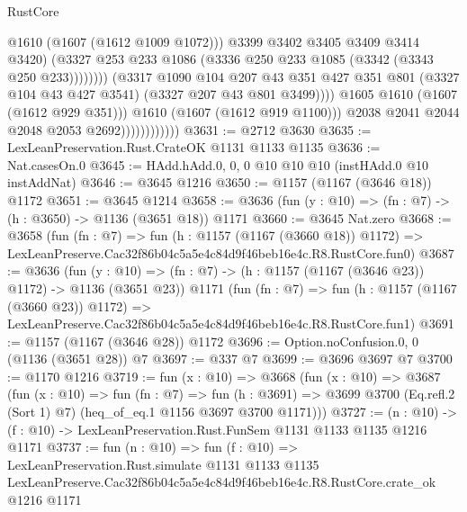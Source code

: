 \begin{lexlean}{RustCore}
\begin{coremodule}
                                                @1610
                                                (@1607 (@1612 @1009 @1072)))
                                              @3399
                                              @3402
                                              @3405
                                              @3409
                                              @3414
                                              @3420)
                                            (@3327
                                              @253
                                              @233
                                              @1086
                                              (@3336 @250 @233 @1085 (@3342 (@3343 @250 @233))))))))
                                    (@3317
                                      @1090
                                      @104
                                      @207
                                      @43
                                      @351
                                      @427
                                      @351
                                      @801
                                      (@3327 @104 @43 @427 @3541)
                                      (@3327 @207 @43 @801 @3499))))
                                @1605
                                @1610
                                (@1607 (@1612 @929 @351)))
                              @1610
                              (@1607 (@1612 @919 @1100)))
                            @2038
                            @2041
                            @2044
                            @2048
                            @2053
                            @2692))))))))))))
@3631 := @2712 @3630
@3635 := LexLeanPreservation.Rust.CrateOK @1131 @1133 @1135
@3636 := Nat.casesOn.{0}
@3645 := HAdd.hAdd.{0, 0, 0} @10 @10 @10 (instHAdd.{0} @10 instAddNat)
@3646 := @3645 @1216
@3650 := @1157 (@1167 (@3646 @18)) @1172
@3651 := @3645 @1214
@3658 := @3636 (fun (y : @10) => (fn : @7) -> (h : @3650) -> @1136 (@3651 @18)) @1171
@3660 := @3645 Nat.zero
@3668 := @3658
    (fun (fn : @7) =>
    fun (h : @1157 (@1167 (@3660 @18)) @1172) =>
    LexLeanPreserve.Cac32f86b04c5a5e4c84d9f46beb16e4c.R8.RustCore.fun0)
@3687 := @3636
    (fun (y : @10) => (fn : @7) -> (h : @1157 (@1167 (@3646 @23)) @1172) -> @1136 (@3651 @23))
    @1171
    (fun (fn : @7) =>
    fun (h : @1157 (@1167 (@3660 @23)) @1172) =>
    LexLeanPreserve.Cac32f86b04c5a5e4c84d9f46beb16e4c.R8.RustCore.fun1)
@3691 := @1157 (@1167 (@3646 @28)) @1172
@3696 := Option.noConfusion.{0, 0} (@1136 (@3651 @28)) @7
@3697 := @337 @7
@3699 := @3696 @3697 @7
@3700 := @1170 @1216
@3719 := fun (x : @10) =>
  @3668
    (fun (x : @10) =>
    @3687
      (fun (x : @10) =>
      fun (fn : @7) =>
      fun (h : @3691) =>
      @3699 @3700 (Eq.refl.{2} (Sort 1) @7) (heq_of_eq.{1} @1156 @3697 @3700 @1171)))
@3727 := (n : @10) -> (f : @10) -> LexLeanPreservation.Rust.FunSem @1131 @1133 @1135 @1216 @1171
@3737 := fun (n : @10) =>
  fun (f : @10) =>
  LexLeanPreservation.Rust.simulate
    @1131
    @1133
    @1135
    LexLeanPreserve.Cac32f86b04c5a5e4c84d9f46beb16e4c.R8.RustCore.crate_ok
    @1216
    @1171
\end{coremodule}
\end{lexlean}
